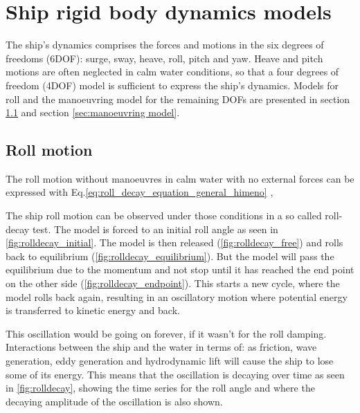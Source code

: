 \chapter{Ship rigid body dynamics models}
\label{ch:models}

The ship's dynamics comprises the forces and motions in the six degrees of freedoms (6DOF): surge, sway, heave, roll, pitch and yaw. Heave and pitch motions are often neglected in calm water conditions, so that a four degrees of freedom (4DOF) model is sufficient to express the ship's dynamics. Models for roll and the manoeuvring model for the remaining DOFs are presented in section \ref{sec:roll} and section \ref{sec:manoeuvring model}. 

\section{Roll motion} \label{sec:roll}
The roll motion without manoeuvres in calm water with no external forces can be expressed with Eq.\ref{eq:roll_decay_equation_general_himeno} \cite{himeno_prediction_1981},

\noindent The ship roll motion can be observed under those conditions in a so called roll-decay test. The model is forced to an initial roll angle as seen in \autoref{fig:rolldecay_initial}. The model is then released (\autoref{fig:rolldecay_free}) and rolls back to equilibrium (\autoref{fig:rolldecay_equilibrium}). But the model will pass the equilibrium due to the momentum and not stop until it has reached the end point on the other side (\autoref{fig:rolldecay_endpoint}). This starts a new cycle, where the model rolls back again, resulting in an oscillatory motion where potential energy is transferred to kinetic energy and back.

\noindent This oscillation would be going on forever, if it wasn't for the roll damping. Interactions between the ship and the water in terms of: as friction, wave generation, eddy generation and hydrodynamic lift will cause the ship to lose some of its energy. This means that the oscillation is decaying over time as seen in \autoref{fig:rolldecay}, showing the time series for the roll angle and where the decaying amplitude of the oscillation is also shown.

